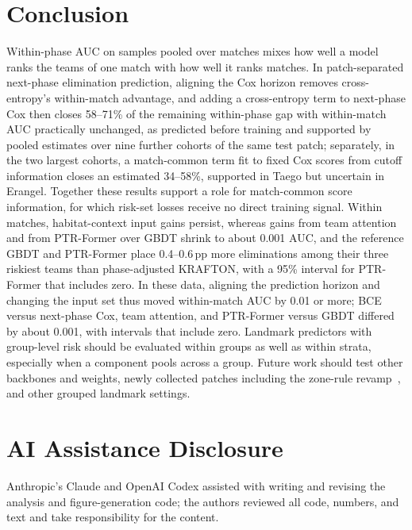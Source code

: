 \documentclass[sigconf,anonymous]{acmart}
\begin{document}
\section{Conclusion}
\label{sec:conclusion}
Within-phase AUC on samples pooled over matches mixes how well a model ranks the teams of one match with how well it ranks matches. In patch-separated next-phase elimination prediction, aligning the Cox horizon removes cross-entropy's within-match advantage, and adding a cross-entropy term to next-phase Cox then closes 58--71\% of the remaining within-phase gap with within-match AUC practically unchanged, as predicted before training and supported by pooled estimates over nine further cohorts of the same test patch; separately, in the two largest cohorts, a match-common term fit to fixed Cox scores from cutoff information closes an estimated 34--58\%, supported in Taego but uncertain in Erangel. Together these results support a role for match-common score information, for which risk-set losses receive no direct training signal. Within matches, habitat-context input gains persist, whereas gains from team attention and from PTR-Former over GBDT shrink to about 0.001 AUC, and the reference GBDT and PTR-Former place 0.4--0.6\,pp more eliminations among their three riskiest teams than phase-adjusted KRAFTON, with a 95\% interval for PTR-Former that includes zero. In these data, aligning the prediction horizon and changing the input set thus moved within-match AUC by 0.01 or more; BCE versus next-phase Cox, team attention, and PTR-Former versus GBDT differed by about 0.001, with intervals that include zero. Landmark predictors with group-level risk should be evaluated within groups as well as within strata, especially when a component pools across a group. Future work should test other backbones and weights, newly collected patches including the zone-rule revamp~\cite{PUBGBlueZone2026}, and other grouped landmark settings.

\section*{AI Assistance Disclosure}
Anthropic's Claude and OpenAI Codex assisted with writing and revising the analysis and figure-generation code; the authors reviewed all code, numbers, and text and take responsibility for the content.



\end{document}
